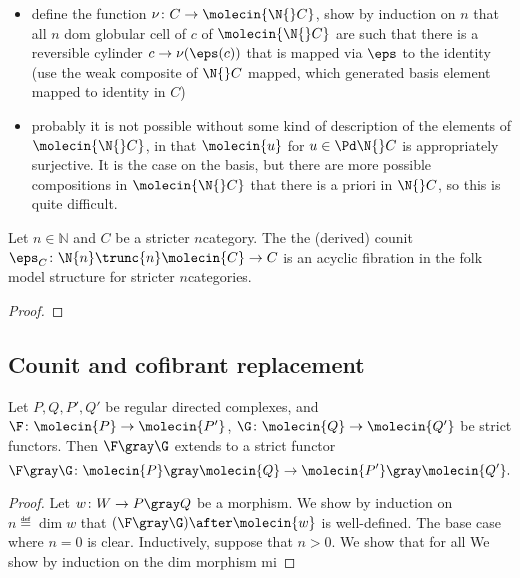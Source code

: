 \begin{itemize}
    \item define the function \( \nu \colon C \to \molecin{\N{}C} \), show by induction on \( n \) that all \( n \) dom globular cell of \( c \) of \( \molecin{\N{} C} \) are such that there is a reversible cylinder \( c \to \nu(\eps(c)) \) that is mapped via \( \eps \) to the identity (use the weak composite of \( \N{} C \) mapped, which generated basis element mapped to identity in \( C \))
    \item probably it is not possible without some kind of description of the elements of \( \molecin{\N{}C} \), in that \( \molecin{u} \) for \( u \in \Pd \N{} C \) is appropriately surjective. It is the case on the basis, but there are more possible compositions in \( \molecin{\N{}C} \) that there is a priori in \( \N{} C \), so this is quite difficult.
\end{itemize}


\begin{thm} \label{thm:cofibrant_replacement_counit_n}
    Let \( n \in \mathbb{N} \) and \( C \) be a stricter \( n \)\nbd category. 
    The the (derived) counit \( \eps_C \colon \N{n}\trunc{n}\molecin{C} \to C \) is an acyclic fibration in the folk model structure for stricter \( n \)\nbd categories.
\end{thm}
\begin{proof}
\end{proof}

\subsection{Counit and cofibrant replacement}



\begin{lem} \label{lem:gray_determines_strict_functors}
    Let \( P, Q, P', Q' \) be regular directed complexes, and \( \F \colon \molecin{P} \to \molecin{P'} \), \( \G \colon \molecin{Q} \to \molecin{Q'} \) be strict functors.
    Then \( \F \gray \G \) extends to a strict functor 
    \begin{equation*}
        \F \gray \G \colon \molecin{P} \gray \molecin{Q} \to \molecin{P'} \gray \molecin{Q'}.
    \end{equation*}
\end{lem}
\begin{proof}
    Let \( w \colon W \to P \gray Q \) be a morphism.
    We show by induction on \( n \eqdef \dim w \) that \( (\F \gray \G) \after \molecin{w} \) is well-defined. 
    The base case where \( n = 0 \) is clear.
    Inductively, suppose that \( n > 0 \).
    We show that for all 
    We show by induction on the dim morphism mi
\end{proof}



